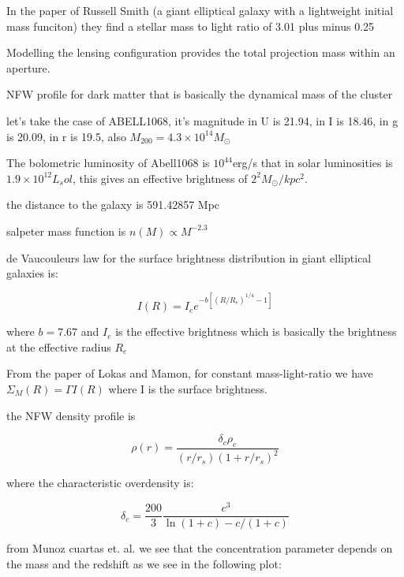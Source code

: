 In the paper of Russell Smith (a giant elliptical galaxy with a lightweight initial mass funciton) they find a stellar mass to light ratio of 3.01 plus minus 0.25

Modelling the lensing configuration provides the total projection mass within an aperture.

NFW profile for dark matter that is basically the dynamical mass of the cluster

let's take the case of ABELL1068, it's magnitude in U is 21.94, in I is 18.46, in g is 20.09, in r is 19.5, also $M_{200}=4.3\times 10^{14}M_{\odot}$

The bolometric luminosity of Abell1068 is $10^44$erg/s that in solar luminosities is $1.9\times 10^{12} L_sol$, this gives an effective brightness of $2^{2}M_{\odot}/kpc^2$.

the distance to the galaxy is 591.42857 Mpc	

salpeter mass function is $n(M)\propto M^{-2.3}$  

de Vaucouleurs law for the surface brightness distribution in giant elliptical galaxies is:

\begin{equation}
I(R)=I_{e}e^{-b\left[\left(R/R_{e}\right)^{1/4}-1\right]}
\end{equation}

where $b=7.67$ and $I_{e}$ is the effective brightness which is basically the brightness at the effective radius $R_{e}$

From the paper of Lokas and Mamon, for constant mass-light-ratio we have $\Sigma_{M}(R)=\Gamma I(R)$ where I is the surface brightness.

the NFW density profile is 

\begin{equation}
\rho(r)=\frac{\delta_{c}\rho_{c}}{(r/r_{s})(1+r/r_{s})^{2}}
\end{equation}

where the characteristic overdensity is:

\begin{equation}
\delta_{c}=\frac{200}{3}\frac{c^{3}}{\ln{(1+c)}-c/(1+c)}
\end{equation}

from Munoz cuartas et. al. we see that the concentration parameter depends on the mass and the redshift as we see in the following plot:

